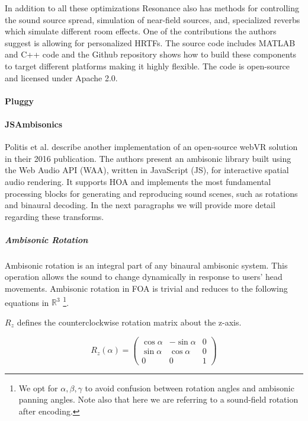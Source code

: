 
In addition to all these optimizations Resonance also has methods for controlling the sound source spread, simulation of near-field sources, and, specialized reverbs which simulate different room effects. One of the contributions the authors suggest is allowing for personalized HRTFs. The source code includes MATLAB and C++ code and the Github repository shows how to build these components to target different platforms making it highly flexible. The code is open-source and licensed under Apache 2.0. 


\paragraph{Pluggy}

\paragraph{JSAmbisonics}

Politis et al. \cite{politis2016jsambisonics} describe another implementation of an open-source webVR solution in their 2016 publication. The authors present an ambisonic library built using the Web Audio API (WAA), written in JavaScript (JS), for interactive spatial audio rendering. It supports HOA and implements the most fundamental processing blocks for generating and reproducing sound scenes, such as rotations and binaural decoding. In the next paragraphs we will provide more detail regarding these transforms. 

\subparagraph{Ambisonic Rotation}

Ambisonic rotation is an integral part of any binaural ambisonic system. This operation allows the sound to change dynamically in response to users' head movements. Ambisonic rotation in FOA is trivial and reduces to the following equations in $\mathbb{R}^{3}$ \cite{kronlachner2014spatial}\footnote{We opt for $\alpha, \beta, \gamma$ to avoid confusion between rotation angles and ambisonic panning angles. Note also that here we are referring to a sound-field rotation after encoding.}. 

$R_z$ defines the counterclockwise rotation matrix about the z-axis.

\begin{equation}
R_{z}(\alpha)=\left(\begin{array}{ccc}
\cos \alpha & -\sin \alpha & 0 \\
\sin \alpha & \cos \alpha & 0 \\
0 & 0 & 1
\end{array}\right)
\end{equation}

